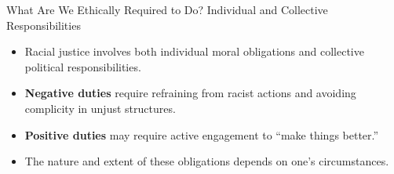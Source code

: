 \documentclass{beamer}
\begin{document}
	\begin{frame}{What Are We Ethically Required to Do? Individual and Collective Responsibilities}
		\begin{itemize}
			\item Racial justice involves both individual moral obligations and collective political responsibilities.
			\item \textbf{Negative duties} require refraining from racist actions and avoiding complicity in unjust structures.
			\item \textbf{Positive duties} may require active engagement to ``make things better.''
			\item The nature and extent of these obligations depends on one's circumstances.
		\end{itemize}
		
		\begin{center}
		\end{center}
	\end{frame}
	
\end{document}
